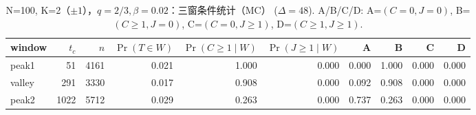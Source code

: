 \begin{table}[!htbp]
\centering
\scriptsize
\setlength{\tabcolsep}{4pt}
\begin{tabular}{lrrrrrrrrr}
\toprule
window & $t_c$ & $n$ & $\Pr(T\in W)$ & $\Pr(C\ge 1\mid W)$ & $\Pr(J\ge 1\mid W)$ & A & B & C & D\\
\midrule
peak1 & 51 & 4161 & 0.021 & 1.000 & 0.000 & 0.000 & 1.000 & 0.000 & 0.000\\
valley & 291 & 3330 & 0.017 & 0.908 & 0.000 & 0.092 & 0.908 & 0.000 & 0.000\\
peak2 & 1022 & 5712 & 0.029 & 0.263 & 0.000 & 0.737 & 0.263 & 0.000 & 0.000\\
\bottomrule
\end{tabular}
\caption{N=100, K=2（$\pm1$），$q=2/3,\beta=0.02$：三窗条件统计（MC） ($\Delta=48$). A/B/C/D: A=$(C=0,J=0)$, B=$(C\ge 1,J=0)$, C=$(C=0,J\ge 1)$, D=$(C\ge 1,J\ge 1)$.}
\label{tab:case-window-N100-K2-beta002}
\end{table}
